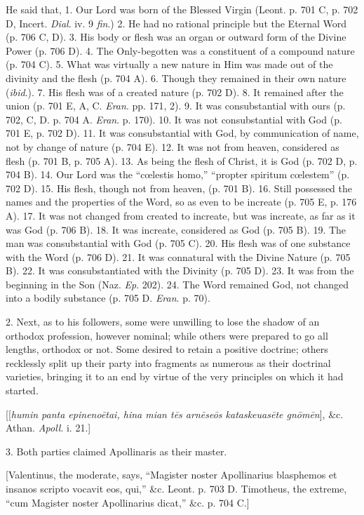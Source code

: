 He said that, 1. Our Lord was born of the Blessed Virgin (Leont. p.
701 C, p. 702 D, Incert. \emph{Dial}. iv. 9 \emph{fin}.) 2. He had no
rational principle but the Eternal Word (p. 706 C, D). 3. His body or
flesh was an organ or outward form of the Divine Power (p. 706 D). 4.
The Only-begotten was a constituent of a compound nature (p. 704 C).
5. What was virtually a new nature in Him was made out of the divinity
and the flesh (p. 704 A). 6. Though they remained in their own nature
(\emph{ibid}.). 7. His flesh was of a created nature (p. 702 D). 8. It
remained after the union (p. 701 E, A, C. \emph{Eran}. pp. 171, 2). 9.
It was consubstantial with ours (p. 702, C, D. p. 704 A. \emph{Eran}.
p. 170). 10. It was not consubstantial with God (p. 701 E, p.
702 D). 11. It was consubstantial with God, by communication of name,
not by change of nature (p. 704 E). 12. It was not from heaven,
considered as flesh (p. 701 B, p. 705 A). 13. As being the flesh of
Christ, it is God (p. 702 D, p. 704 B). 14. Our Lord was the ``cœlestis
homo,'' ``propter spiritum cœlestem'' (p. 702 D). 15. His
flesh, though not from heaven, (p. 701 B). 16. Still possessed the
names and the properties of the Word, so as even to be increate (p.
705 E, p. 176 A). 17. It was not changed from created to increate, but
was increate, as far as it was God (p. 706 B). 18. It was increate,
considered as God (p. 705 B). 19. The man was consubstantial with God
(p. 705 C). 20. His flesh was of one substance with the Word (p. 706
D). 21. It was connatural with the Divine Nature (p. 705 B). 22. It
was consubstantiated with the Divinity (p. 705 D). 23. It was from the
beginning in the Son (Naz. \emph{Ep}. 202). 24. The Word remained God,
not changed into a bodily substance (p. 705 D. \emph{Eran}. p. 70).

2. Next, as to his followers, some were unwilling to lose the
shadow of an orthodox profession, however nominal; while others were
prepared to go all lengths, orthodox or not. Some desired to retain a
positive doctrine; others recklessly split up their party into
fragments as numerous as their doctrinal varieties, bringing it to an
end by virtue of the very principles on which it had started.

[[\emph{humin panta epineno\={e}tai, hina mian t\={e}s arn\={e}se\={o}s
kataskeuas\={e}te gn\={o}m\={e}n}], \&c. Athan. \emph{Apoll}.
i. 21.]

3. Both parties claimed Apollinaris as their master.

[Valentinus, the moderate, says, ``Magister noster Apollinarius
blasphemos et insanos scripto vocavit eos,
qui,'' \&c. Leont. p. 703 D. Timotheus, the extreme, ``cum
Magister noster Apollinarius dicat,'' \&c. p. 704 C.]

